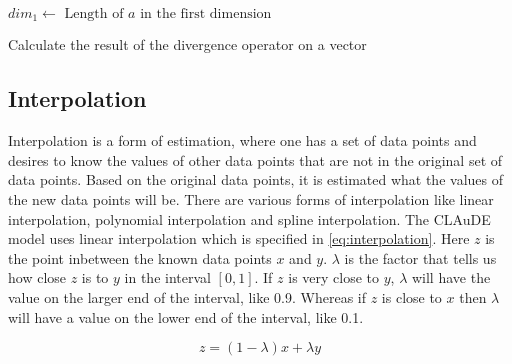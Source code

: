 \begin{algorithm}[!hbt]
    $dim_1 \leftarrow \text{ Length of } a \text{ in the first dimension}$ \;
     \;
    \caption{Calculate the result of the divergence operator on a vector}
    \label{alg:divergence}
\end{algorithm}

\subsection{Interpolation} \label{sec:interpolation}
Interpolation is a form of estimation, where one has a set of data points and desires to know the values of other data points that are not in the original set of data points\cite{interpolation}. 
Based on the original data points, it is estimated what the values of the new data points will be. There are various forms of interpolation like linear interpolation, polynomial interpolation 
and spline interpolation. The CLAuDE model uses linear interpolation which is specified in \autoref{eq:interpolation}. Here $z$ is the point inbetween the known data points $x$ and $y$. 
$\lambda$ is the factor that tells us how close $z$ is to $y$ in the interval $[0, 1]$. If $z$ is very close to $y$, $\lambda$ will have the value on the larger end of the interval, like 0.9.
Whereas if $z$ is close to $x$ then $\lambda$ will have a value on the lower end of the interval, like 0.1.

\begin{equation}
    z = (1 - \lambda)x + \lambda y
    \label{eq:interpolation}
\end{equation}

